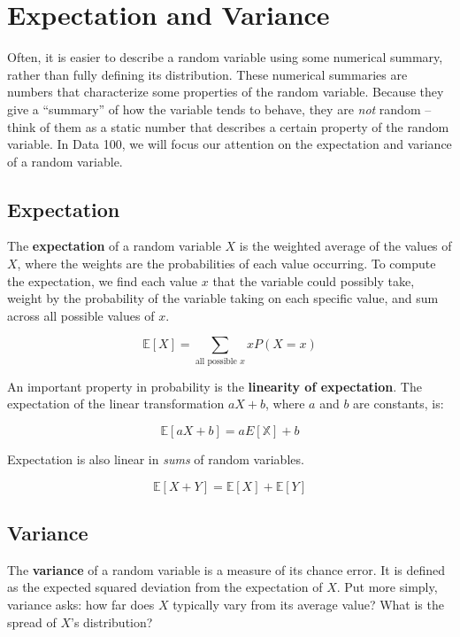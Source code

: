 \documentclass[
  letterpaper,
  DIV=11,
  numbers=noendperiod]{scrreprt}
\begin{document}
\hypertarget{expectation-and-variance}{%
\section{Expectation and Variance}\label{expectation-and-variance}}

Often, it is easier to describe a random variable using some numerical
summary, rather than fully defining its distribution. These numerical
summaries are numbers that characterize some properties of the random
variable. Because they give a ``summary'' of how the variable tends to
behave, they are \emph{not} random -- think of them as a static number
that describes a certain property of the random variable. In Data 100,
we will focus our attention on the expectation and variance of a random
variable.

\hypertarget{expectation}{%
\subsection{Expectation}\label{expectation}}

The \textbf{expectation} of a random variable \(X\) is the weighted
average of the values of \(X\), where the weights are the probabilities
of each value occurring. To compute the expectation, we find each value
\(x\) that the variable could possibly take, weight by the probability
of the variable taking on each specific value, and sum across all
possible values of \(x\).

\[\mathbb{E}[X] = \sum_{\text{all possible } x} x P(X=x)\]

An important property in probability is the \textbf{linearity of
expectation}. The expectation of the linear transformation \(aX+b\),
where \(a\) and \(b\) are constants, is:

\[\mathbb{E}[aX+b] = aE[\mathbb{X}] + b\]

Expectation is also linear in \emph{sums} of random variables.

\[\mathbb{E}[X+Y] = \mathbb{E}[X] + \mathbb{E}[Y]\]

\hypertarget{variance}{%
\subsection{Variance}\label{variance}}

The \textbf{variance} of a random variable is a measure of its chance
error. It is defined as the expected squared deviation from the
expectation of \(X\). Put more simply, variance asks: how far does \(X\)
typically vary from its average value? What is the spread of \(X\)'s
distribution?
\end{document}
